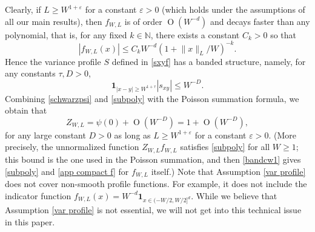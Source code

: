 \documentclass{article}
\newcommand{\1}{\mathds{1}}
\numberwithin{equation}{section}
\newcommand{\be}{\begin{equation}}
\newcommand{\ee}{\end{equation}}
\newcommand{\e}{{\varepsilon}}
\newcommand{\ii}{\mathrm{i}} %
\renewcommand{\leq}{\leqslant}
\renewcommand{\geq}{\geqslant}
\renewcommand{\le}{\leq}
\renewcommand{\ge}{\geq}
\newcommand{\N}{\mathbb{N}}
\newcommand{\Z}{\mathbb{Z}}
\DeclareMathOperator{\OO}{O}
\theoremstyle{plain} %
\theoremstyle{remark}
\begin{document}
Clearly, if $L\ge W^{1+\e}$ for a constant $\e>0$ (which holds under the assumptions of all our main results), then $f_{W,L}$ is of order $\OO(W^{-d})$
and decays faster than any polynomial, that is, for any fixed $k\in \N$, there exists a constant $C_k>0$ so that
\be\label{subpoly}
|f_{W,L}(x)|\le C_k W^{-d}\left(1+ {\|x\|_L}/{W}\right)^{-k}.%
\ee
Hence the variance profile $S$ defined in \eqref{sxyf}  has a banded structure, namely,  for any constants $\tau,D>0$,
\be\label{app compact f}
\mathbf 1_{|x-y|\ge W^{1+\tau}}|s_{xy}|\le W^{-D}.
\ee
Combining \eqref{schwarzpsi} and \eqref{subpoly} with the Poisson summation formula, we obtain that  
\be\label{bandcw1} 
Z_{W,L} =   \psi(0) + \OO(W^{-D})=1+ \OO(W^{-D}),
\ee
for any large constant $D>0$ as long as $L\ge W^{1+\e}$ for a constant $\e>0$. (More precisely, the unnormalized function $Z_{W,L}f_{W,L}$ satisfies \eqref{subpoly} for all $W\ge 1$; this bound is the one used in the Poisson summation, and then \eqref{bandcw1} gives \eqref{subpoly} and \eqref{app compact f} for $f_{W,L}$ itself.)
Note that Assumption \ref{var profile} does not cover non-smooth profile functions. For example, it does not  include the indicator function $f_{W,L}(x)=W^{-d}\mathbf 1_{x\in (-W/2,W/2]^d}$. While we believe that Assumption \ref{var profile} is not essential, we will not get into this technical issue in this paper. 
\end{document}
